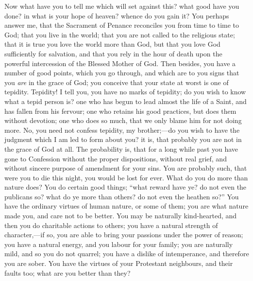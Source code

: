 Now what have you to tell me which will set against this? what good
have you done? in what is your hope of heaven? whence do you gain it?
You perhaps answer me, that the Sacrament of Penance reconciles you
from time to time to God; that you live in the world; that you are not
called to the religious state; that it is true you love the world more
than God, but that you love God sufficiently for salvation, and that
you rely in the hour of death upon the powerful intercession of the
Blessed Mother of God. Then besides, you have a number of good points,
which you go through, and which are to you signs that you \emph{are}
in the grace of God; you conceive that your state at worst is one of
tepidity. Tepidity! I tell you, you have no marks of tepidity; do you
wish to know what a tepid person is? one who has begun to lead almost
the life of a Saint, and has fallen from his fervour; one who retains
his good practices, but does them without devotion; one who does so
much, that we only blame him for not doing more. No, you need not
confess tepidity, my brother;—do you wish to have the judgment which
I am led to form about you? it is, that probably you are not in the
grace of God at all. The probability is, that for a long while past
you have gone to Confession without the proper dispositions, without
real grief, and without sincere purpose of amendment for your sins.
You are probably such, that were you to die this night, you would be
lost for ever. What do you do more than nature does? You do certain
good things; ``what reward have ye? do not even the publicans so?
what do ye more than others? do not even the heathen so?'' You
have the ordinary virtues of human nature, or some of them; you are
what nature made you, and care not to be better. You may be naturally
kind-hearted, and then you do charitable actions to others; you have a
natural strength of character,—if so, you are able to bring your
passions under the power of reason; you have a natural energy, and you
labour for your family; you are naturally mild, and so you do not
quarrel; you have a dislike of intemperance, and therefore you are
sober. You have the virtues of your Protestant neighbours, and their
faults too; what are you better than they?

